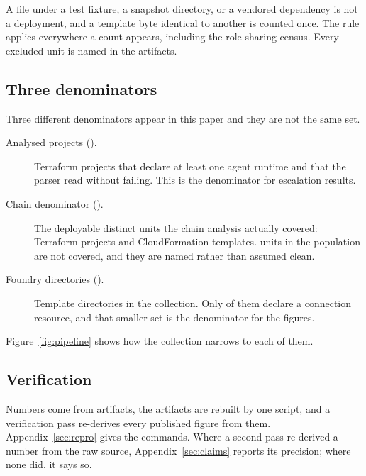 A file under a test fixture, a snapshot directory, or a vendored dependency is
not a deployment, and a template byte identical to another is counted once.
The rule applies everywhere a count appears, including the role sharing
census. Every excluded unit is named in the artifacts.

\subsection{Three denominators}
\label{sec:populations}

Three different denominators appear in this paper and they are not the same
set.

\begin{description}
\item[Analysed projects (\nProjects).] Terraform projects that declare at
  least one agent runtime and that the parser read without failing. This is
  the denominator for escalation results.
\item[Chain denominator (\nChainDenominator).] The deployable distinct units
  the chain analysis actually covered: \nChainTerraform Terraform projects and
  \nChainCfn CloudFormation templates. \nChainNotCovered units in the
  population are not covered, and they are named rather than assumed clean.
\item[Foundry directories (\nFoundryDirs).] Template directories in the
  \foundry collection. Only \nFoundryAuthDirs of them declare a connection
  resource, and that smaller set is the denominator for the 
  figures.
\end{description}

Figure~\ref{fig:pipeline} shows how the collection narrows to each of them.



\subsection{Verification}

Numbers come from artifacts, the artifacts are rebuilt by one script, and a
verification pass re-derives every published figure from them.
Appendix~\ref{sec:repro} gives the commands. Where a second pass re-derived a
number from the raw source, Appendix~\ref{sec:claims} reports its precision;
where none did, it says so.
